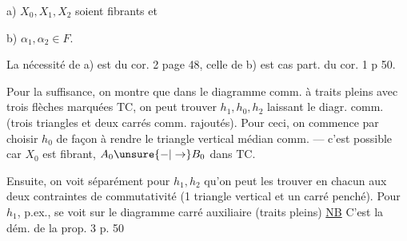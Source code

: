 a) $X_0,X_1,X_2$ soient fibrants et

b) $\alpha_1,\alpha_2\in F$.

La nécessité de a) est  du cor. 2 page 48, celle de b) est cas part. du cor. 1 p 50.

Pour la suffisance,  on  montre que dans le diagramme comm. à traits pleins
avec trois flèches marquées $\mathrm{TC}$, on peut trouver $h_1,h_0,h_2$ laissant le diagr. comm. (trois triangles et deux carrés comm. rajoutés). Pour ceci, on commence par choisir $h_0$ de façon à rendre le triangle vertical médian comm. --- c'est possible car $X_0$ est fibrant, $A_0\unsure{-|\to}B_0$ dans $\mathrm{TC}$.

Ensuite, on voit séparément pour $h_1,h_2$ qu'on peut les trouver en  chacun aux deux contraintes de commutativité (1 triangle vertical et un carré penché). Pour $h_1$, p.ex.,  se voit sur le diagramme carré auxiliaire (traits pleins)
\uline{NB} C'est la dém. de la prop. 3 p. 50

